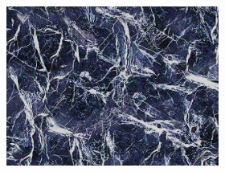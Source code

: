 \begin{figure}[]
\begin{subfigure}{\textwidth}
\begin{subfigure}{0.19\textwidth}
            \includegraphics[width=\textwidth]{images/04-experiment02/isolating_issues/210_pixel.jpg}
            \caption*{}
        \end{subfigure}


\end{subfigure}
\end{figure}
